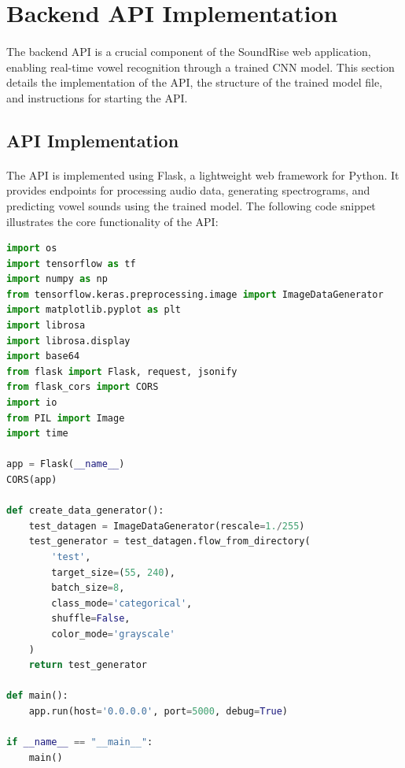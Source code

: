 \section{Backend API Implementation}
\label{sec:backend-api}

\paragraph{}
The backend API is a crucial component of the SoundRise web application, enabling real-time vowel recognition through a trained CNN model. This section details the implementation of the API, the structure of the trained model file, and instructions for starting the API.

\subsection{API Implementation}
\label{subsec:api-implementation}

\paragraph{}
The API is implemented using Flask, a lightweight web framework for Python. It provides endpoints for processing audio data, generating spectrograms, and predicting vowel sounds using the trained model. The following code snippet illustrates the core functionality of the API:

\begin{lstlisting}[language=Python, caption={Backend API Implementation}]
import os
import tensorflow as tf
import numpy as np
from tensorflow.keras.preprocessing.image import ImageDataGenerator
import matplotlib.pyplot as plt
import librosa
import librosa.display
import base64
from flask import Flask, request, jsonify
from flask_cors import CORS
import io
from PIL import Image
import time

app = Flask(__name__)
CORS(app)

def create_data_generator():
    test_datagen = ImageDataGenerator(rescale=1./255)
    test_generator = test_datagen.flow_from_directory(
        'test',
        target_size=(55, 240),
        batch_size=8,
        class_mode='categorical',
        shuffle=False,
        color_mode='grayscale'
    )
    return test_generator

def main():
    app.run(host='0.0.0.0', port=5000, debug=True)

if __name__ == "__main__":
    main()
\end{lstlisting}

